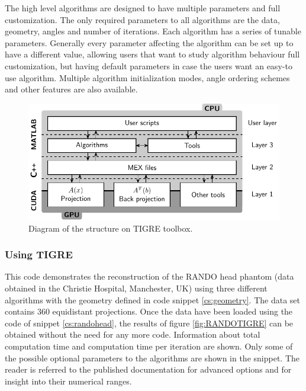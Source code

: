 The high level algorithms are designed to have multiple parameters and full customization. The only required parameters to all algorithms are the data, geometry, angles and number of iterations. Each algorithm has a series of tunable parameters. Generally every parameter affecting the algorithm can be set up to have a different value, allowing users that want to study algorithm behaviour full customization, but having default parameters in case the users want an easy-to use algorithm. Multiple algorithm initialization modes, angle ordering schemes and other features are also available. 

\begin{figure}
\begin{center}

\includegraphics{GPUmethods/structureTIGRE-figure0.pdf} 
\end{center}

\caption[Diagram of the structure of the TIGRE toolbox]{\label{fig:structureTIGRE} Diagram of the structure on TIGRE toolbox.} 
\end{figure}

\subsubsection{Using TIGRE}
This code demonstrates the reconstruction of the RANDO head phantom (data obtained in the Christie Hospital, Manchester, UK) using three different algorithms with the geometry defined in code snippet \ref{cs:geometry}. The data set contains 360 equidistant projections. Once the data have been loaded using the code of snippet \ref{cs:randohead}, the results of figure \ref{fig:RANDOTIGRE} can be obtained without the need for any more code. Information about total computation time and computation time per iteration are shown. Only some of the possible optional parameters to the algorithms are shown in the snippet. The reader is referred to the published documentation for advanced options and for insight into their numerical ranges. 

